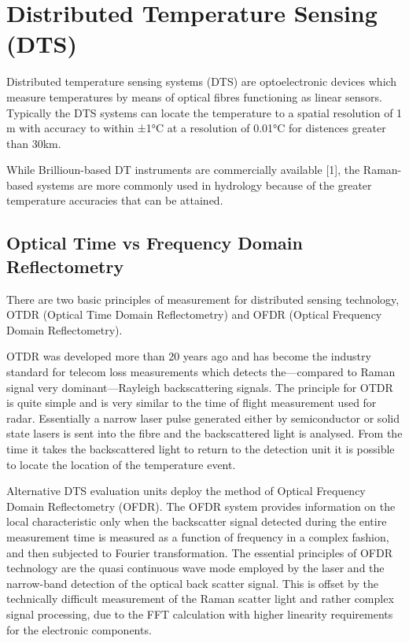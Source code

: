 \documentclass[twocolumn]{article}
\numberwithin{equation}{section}
\begin{document}
\newpage
\section{Distributed Temperature Sensing (DTS)}
Distributed temperature sensing systems (DTS) are optoelectronic devices which measure temperatures by means of optical fibres functioning as linear sensors.
Typically the DTS systems can locate the temperature to a spatial resolution of 1 m with accuracy to within ±1°C at a resolution of 0.01°C for distences greater than 30km.


While Brillioun-based DT instruments are commercially available [1], the Raman-based systems are more commonly used in hydrology because of the greater temperature accuracies that can be attained.


\subsection{Optical Time vs Frequency Domain Reflectometry}
There are two basic principles of measurement for distributed sensing technology, OTDR (Optical Time Domain Reflectometry) and OFDR (Optical Frequency Domain Reflectometry).

OTDR was developed more than 20 years ago and has become the industry standard for telecom loss measurements which detects the—compared to Raman signal very dominant—Rayleigh backscattering signals. The principle for OTDR is quite simple and is very similar to the time of flight measurement used for radar. Essentially a narrow laser pulse generated either by semiconductor or solid state lasers is sent into the fibre and the backscattered light is analysed. From the time it takes the backscattered light to return to the detection unit it is possible to locate the location of the temperature event.

Alternative DTS evaluation units deploy the method of Optical Frequency Domain Reflectometry (OFDR). The OFDR system provides information on the local characteristic only when the backscatter signal detected during the entire measurement time is measured as a function of frequency in a complex fashion, and then subjected to Fourier transformation. The essential principles of OFDR technology are the quasi continuous wave mode employed by the laser and the narrow-band detection of the optical back scatter signal. This is offset by the technically difficult measurement of the Raman scatter light and rather complex signal processing, due to the FFT calculation with higher linearity requirements for the electronic components.
\end{document}
